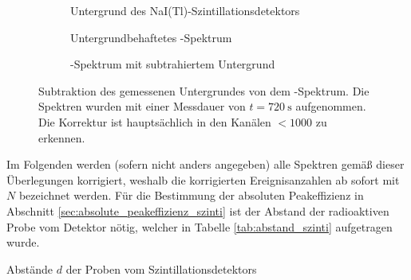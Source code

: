 \documentclass[11pt, a4paper]{article}
\numberwithin{equation}{section}
\begin{document}
\begin{figure}[hp]
	\centering
	\begin{subfigure}[b]{0.65\textwidth}
		\resizebox{!}{0.282\textheight}{
		
		}
		\caption{Untergrund des NaI(Tl)-Szintillationsdetektors}
		\label{fig:untergrund_szinti}
	\end{subfigure}
	
	\begin{subfigure}[b]{0.65\textwidth}
		\resizebox{!}{0.282\textheight}{
		
		}
		\caption{Untergrundbehaftetes -Spektrum}
		\label{fig:cobalt_mit_untergrund}
	\end{subfigure}
	
	\begin{subfigure}[b]{0.65\textwidth}
		\resizebox{!}{0.282\textheight}{
		
		}
		\caption{-Spektrum mit subtrahiertem Untergrund}
		\label{fig:cobalt_ohne_untergrund}
	\end{subfigure}
	\caption{Subtraktion des gemessenen Untergrundes von dem -Spektrum. Die Spektren wurden mit einer Messdauer von $t = \SI{720}{\second}$ aufgenommen. Die Korrektur ist hauptsächlich in den Kanälen $< 1000$ zu erkennen.}
	\label{fig:abzug_untergrund}
\end{figure}
Im Folgenden werden (sofern nicht anders angegeben) alle Spektren gemäß dieser Überlegungen korrigiert, weshalb die korrigierten Ereignisanzahlen ab sofort mit $N$ bezeichnet werden.
Für die Bestimmung der absoluten Peakeffizienz in Abschnitt \ref{sec:absolute_peakeffizienz_szinti} ist der Abstand der radioaktiven Probe vom Detektor nötig, welcher in Tabelle \ref{tab:abstand_szinti} aufgetragen wurde.
\begin{table}[ht]
	\centering
	
	\caption{Abstände $d$ der Proben vom Szintillationsdetektors}
	\label{tab:abstand_szinti}
\end{table}
\end{document}
